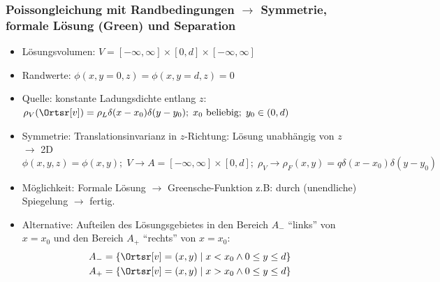 \begin{frame}
  \frametitle{Poissongleichung mit Randbedingungen $\to$ Symmetrie, formale Lösung (Green) und Separation}

  \begin{itemize}[<+->]
  \item Lösungsvolumen: $V = [-\infty,\infty] \times [0,d]\times [-\infty,\infty]$
  \item Randwerte: $\phi(x,y=0,z)=\phi(x,y=d,z) = 0$
  \item Quelle: konstante Ladungsdichte entlang $z$: $\rho_V (\Ortsr[v])
    = \rho_L \delta(x-x_0)\delta(y-y_0);\; x_0 \text{ beliebig};\; y_0
    \in (0,d)$
  \item Symmetrie: \alert{Translationsinvarianz} in $z$-Richtung: Lösung unabhängig von $z$ $\to$ \alert{2D}
    $$
    \phi(x,y,z) = \phi(x,y); \; V\to A= [-\infty,\infty] \times [0,d]; \; \rho_V \to \rho_F(x,y) = q \delta(x-x_0)\delta(y-y_0)  
    $$
  \item Möglichkeit: Formale Lösung $\to$ Greensche-Funktion z.B: durch (unendliche) Spiegelung $\to$ fertig.
  \item Alternative: Aufteilen des Lösungsgebietes in den Bereich $A_-$ \enquote{links} von $x=x_0$ und den Bereich $A_+$ \enquote{rechts} von $x=x_0$:
    \begin{align*}
      A_- &= \{\Ortsr[v] = (x,y)\; |\; x<x_0 \land 0\le y\le d \} \\
      A_+ &= \{\Ortsr[v] = (x,y)\; |\; x>x_0 \land 0\le y\le d \} 
      \end{align*}
  \end{itemize}
\end{frame}

